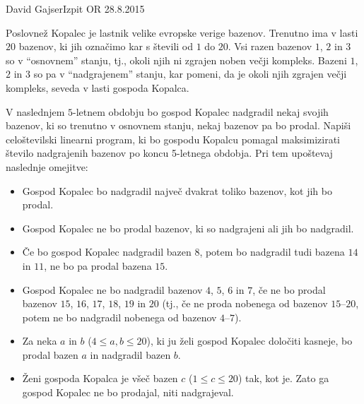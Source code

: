\begin{naloga}{David Gajser}{Izpit OR 28.8.2015}
\begin{vprasanje}
Poslovnež Kopalec je lastnik velike evropske verige bazenov.
Trenutno ima v lasti $20$ bazenov,
ki jih označimo kar s števili od $1$ do $20$.
Vsi razen bazenov $1$, $2$ in $3$ so v ``osnovnem'' stanju,
tj., okoli njih ni zgrajen noben večji kompleks.
Bazeni $1$, $2$ in $3$ so pa v ``nadgrajenem'' stanju,
kar pomeni, da je okoli njih zgrajen večji kompleks,
seveda v lasti gospoda Kopalca.

V naslednjem $5$-letnem obdobju
bo gospod Kopalec nadgradil nekaj svojih bazenov,
ki so trenutno v osnovnem stanju,
nekaj bazenov pa bo prodal.
Napiši celoštevilski linearni program,
ki bo gospodu Kopalcu pomagal maksimizirati število nadgrajenih bazenov
po koncu 5-letnega obdobja. Pri tem upoštevaj naslednje omejitve:
\begin{itemize}
\item Gospod Kopalec bo nadgradil največ dvakrat toliko bazenov,
kot jih bo prodal.
\item Gospod Kopalec ne bo prodal bazenov,
ki so nadgrajeni ali jih bo nadgradil.
\item Če bo gospod Kopalec nadgradil bazen $8$,
potem bo nadgradil tudi bazena $14$ in $11$, ne bo pa prodal bazena $15$.
\item Gospod Kopalec ne bo nadgradil bazenov $4$, $5$, $6$ in $7$,
če ne bo prodal bazenov $15$, $16$, $17$, $18$, $19$ in $20$
(tj., če ne proda nobenega od bazenov $15$--$20$,
potem ne bo nadgradil nobenega od bazenov $4$--$7$).
\item Za neka $a$ in $b$ ($4 \le a, b \le 20$),
ki ju želi gospod Kopalec določiti kasneje,
bo prodal bazen $a$ in nadgradil bazen $b$.
\item Ženi gospoda Kopalca je všeč bazen $c$ ($1 \le c \le 20$) tak, kot je.
Zato ga gospod Kopalec ne bo prodajal, niti nadgrajeval.
\end{itemize}
\end{vprasanje}
\begin{odgovor}
\end{odgovor}
\end{naloga}
